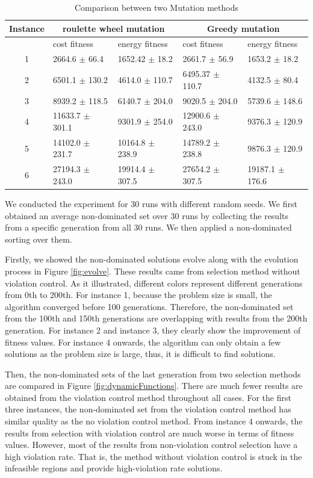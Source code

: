 \begin{table}[!ht]
\centering
\caption{Comparison between two Mutation methods}
\label{tab:mutations}
\begin{tabular}{@{}cllll@{}}
\toprule
Instance & \multicolumn{2}{c}{roulette wheel mutation} & \multicolumn{2}{c}{Greedy mutation}   \\ \midrule
        & cost fitness         & energy fitness       & cost fitness      & energy fitness    \\
1       & 2664.6 $\pm$ 66.4      & 1652.42 $\pm$ 18.2     & 2661.7 $\pm$ 56.9   & 1653.2 $\pm$ 18.2   \\
2       & 6501.1 $\pm$ 130.2     & 4614.0 $\pm$ 110.7     & 6495.37 $\pm$ 110.7 & 4132.5 $\pm$ 80.4   \\
3       & 8939.2 $\pm$ 118.5     & 6140.7 $\pm$ 204.0     & 9020.5 $\pm$ 204.0  & 5739.6 $\pm$ 148.6  \\
4       & 11633.7 $\pm$ 301.1    & 9301.9 $\pm$ 254.0     & 12900.6 $\pm$ 243.0 & 9376.3 $\pm$ 120.9  \\
5       & 14102.0 $\pm$ 231.7    & 10164.8 $\pm$ 238.9    & 14789.2 $\pm$ 238.8 & 9876.3 $\pm$ 120.9  \\
6       & 27194.3 $\pm$ 243.0    & 19914.4 $\pm$ 307.5    & 27654.2 $\pm$ 307.5 & 19187.1 $\pm$ 176.6 \\ \bottomrule
\end{tabular}
\end{table}

We conducted the experiment for 30 runs with different random seeds. We first obtained an average non-dominated set over 30 runs by collecting the results from a specific generation from all 30 runs. We then applied a non-dominated sorting over them.

Firstly, we showed the non-dominated solutions evolve along with the evolution process in Figure \ref{fig:evolve}.
These results came from selection method without violation control. 
As it illustrated, different colors represent different generations from 0th to 200th. 
For instance 1, because the problem size is small, the algorithm converged before 100 generations. Therefore, the non-dominated set from the 100th and 150th generations are overlapping with results from the 200th generation. For instance 2 and instance 3, they clearly show the improvement of fitness values. For instance 4 onwards, the algorithm can only obtain a few solutions as the problem size is large, thus, it is difficult to find solutions.

Then, the non-dominated sets of the last generation from two selection methods are compared in Figure \ref{fig:dynamicFunctions}. There are much fewer results are obtained from the violation control method throughout all cases. For the first three instances, the non-dominated set from the violation control method has similar quality
as the no violation control method. From instance 4 onwards, the results from selection with violation control are much worse in terms of fitness values. However, most of the results from non-violation control selection have a high violation rate. That is, the method without violation control is stuck in the infeasible regions and provide high-violation rate solutions. 

